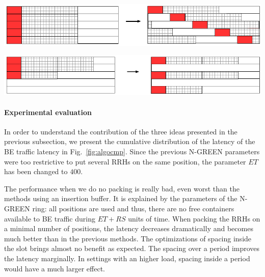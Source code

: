 \documentclass[]{llncs}
\begin{document}
     \begin{minipage}[b]{0.5\linewidth}
        \begin{center}
      \includegraphics[scale=0.55]{repart2}
            
          \label{fig:repart1}
      \end{center} 
  \end{minipage}
    \begin{minipage}[b]{0.5\linewidth}
        \begin{center}
      \includegraphics[scale=0.55]{repart1}
      
          \label{fig:repart2}
      \end{center} 
  \end{minipage}

  
  \paragraph{Experimental evaluation}

  In order to understand the contribution of the three ideas presented in the previous subsection,
   we present the cumulative distribution of the latency of the BE traffic latency in Fig.~\ref{fig:algocmp}. Since the previous N-GREEN parameters were too restrictive to put several RRHs on the same position, the parameter $ET$ has been changed to $400$.

The performance when we do no packing is really bad, even worst than the methods using an insertion buffer. It is explained by the parameters of the N-GREEN ring: all positions are used and thus, there are no free containers available to BE traffic during $ET+RS$ units of time. When packing the RRHs on a minimal number of positions, the latency decreases dramatically and becomes much better than in the previous methods. The optimizations of spacing inside the slot brings almost no benefit as expected. The spacing over a period improves the latency marginally. In settings with an higher load, spacing inside a period would have a much larger effect.
\end{document}
